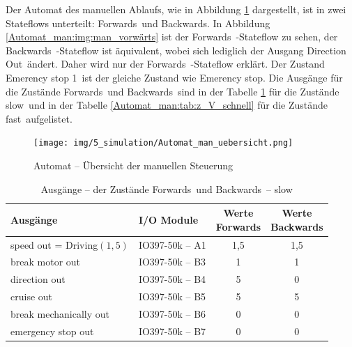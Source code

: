 Der Automat des manuellen Ablaufs, wie in Abbildung \ref{Automat_man:img:man_übersicht} dargestellt, ist in zwei Stateflows unterteilt: \frqq Forwards\flqq\ und \frqq Backwards\flqq . In Abbildung \ref{Automat_man:img:man_vorwärts} ist der \frqq Forwards\flqq\ -Stateflow zu sehen, der \frqq Backwards\flqq\ -Stateflow ist äquivalent, wobei sich lediglich der Ausgang \frqq Direction Out\flqq\ ändert. Daher wird nur der \frqq Forwards\flqq\ -Stateflow erklärt. Der Zustand \frqq Emerency stop 1\flqq\ ist der gleiche Zustand wie \frqq Emerency stop\flqq. Die Ausgänge für die Zustände \frqq Forwards\flqq\ und \frqq Backwards\flqq\ sind in der Tabelle \ref{Automat_man:tab:z_V_langsam} für die Zustände \frqq slow\flqq\ und in der Tabelle \ref{Automat_man:tab:z_V_schnell} für die Zustände \frqq fast\flqq\ aufgelistet.




\pagebreak[1]
\begin{figure}[!ht]
	\begin{center}
		\texttt{[image: img/5\_simulation/Automat\_man\_uebersicht.png]}
		\caption{Automat – Übersicht der manuellen Steuerung}
		\label{Automat_man:img:man_übersicht}
	\end{center}
\end{figure}
\pagebreak[1]


\pagebreak[1]
\begin{table}[!ht]
	\centering
	\caption{Ausgänge – der Zustände \frqq Forwards\flqq\ und \frqq Backwards\flqq\ –  \frqq slow\flqq}
	\label{Automat_man:tab:z_V_langsam}
	\begin{tabular}{llcc}
		\hline
		\textbf{Ausgänge}                               & \textbf{I/O Module}                 & \makecell{\textbf{Werte}       \\ \textbf{\frqq Forwards\flqq}} & \makecell{\textbf{Werte}     \\ \textbf{\frqq Backwards\flqq}}  \\ \hline
		\multicolumn{1}{l|}{speed out = Driving$(1,5)$} & \multicolumn{1}{l|}{IO397-50k – A1} & 1,5                      & 1,5 \\
		\multicolumn{1}{l|}{break motor out}            & \multicolumn{1}{l|}{IO397-50k – B3} & 1                        & 1   \\
		\multicolumn{1}{l|}{direction out}              & \multicolumn{1}{l|}{IO397-50k – B4} & 5                        & 0   \\
		\multicolumn{1}{l|}{cruise out}                 & \multicolumn{1}{l|}{IO397-50k – B5} & 5                        & 5   \\
		\multicolumn{1}{l|}{break mechanically out}     & \multicolumn{1}{l|}{IO397-50k – B6} & 0                        & 0   \\
		\multicolumn{1}{l|}{emergency stop out}         & \multicolumn{1}{l|}{IO397-50k – B7} & 0                        & 0   \\ \hline
	\end{tabular}
\end{table}
\pagebreak[1]

